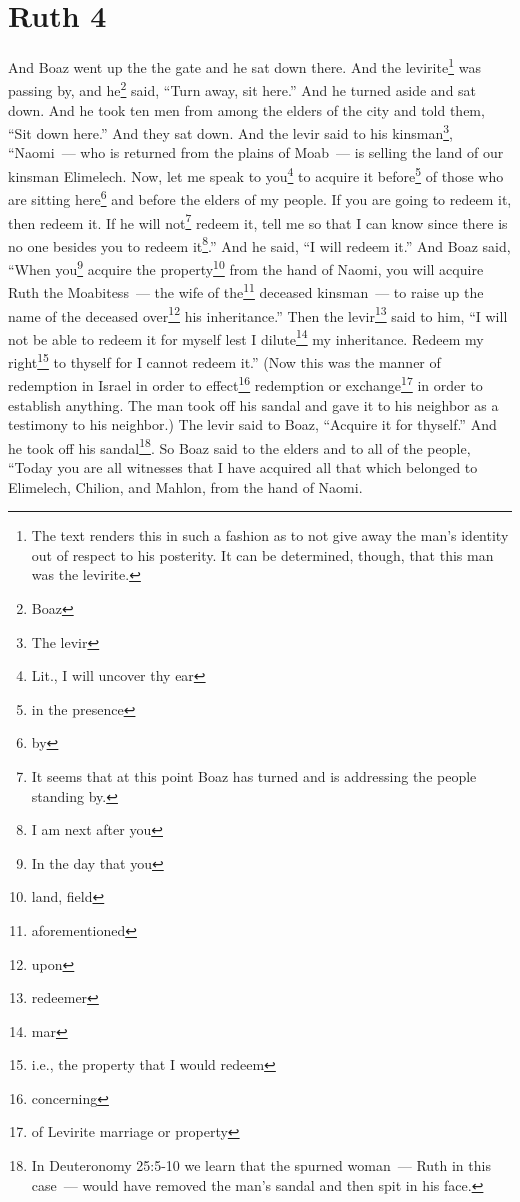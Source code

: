 \section{Ruth 4}\label{Ruth 4}
\begin{enumerate}[align=center]
     And Boaz went up the the gate and he sat down there. And the levirite\footnote{The text renders this in such a fashion as to not give away the man's identity out of respect to his posterity. It can be determined, though, that this man was the levirite.} was passing by, and he\footnote{Boaz} said, ``Turn away, sit here.'' And he turned aside and sat down.%
     And he took ten men from among the elders of the city and told them, ``Sit down here.'' And they sat down.%
     And the levir said to his kinsman\footnote{The levir}, ``Naomi~--- who is returned from the plains of Moab~--- is selling the land of our kinsman Elimelech.%
     Now, let me speak to you\footnote{Lit., I will uncover thy ear} to acquire it before\footnote{in the presence} of those who are sitting here\footnote{by} and before the elders of my people. If you are going to redeem it, then redeem it. If he will not\footnote{It seems that at this point Boaz has turned and is addressing the people standing by.} redeem it, tell me so that I can know since there is no one besides you to redeem it\footnote{I am next after you}.'' And he said, ``I will redeem it.''%
     And Boaz said, ``When you\footnote{In the day that you} acquire the property\footnote{land, field} from the hand of Naomi, you will acquire Ruth the Moabitess~--- the wife of the\footnote{aforementioned} deceased kinsman~--- to raise up the name of the deceased over\footnote{upon} his inheritance.''%
     Then the levir\footnote{redeemer} said to him, ``I will not be able to redeem it for myself lest I dilute\footnote{mar} my inheritance. Redeem my right\footnote{i.e., the property that I would redeem} to thyself for I cannot redeem it.''%
     (Now this was the manner of redemption in Israel in order to effect\footnote{concerning} redemption or exchange\footnote{of Levirite marriage or property} in order to establish anything. The man took off his sandal and gave it to his neighbor as a testimony to his neighbor.)%
     The levir said to Boaz, ``Acquire it for thyself.'' And he took off his sandal\footnote{In Deuteronomy 25:5-10 we learn that the spurned woman~--- Ruth in this case~--- would have removed the man's sandal and then spit in his face.}.%
     So Boaz said to the elders and to all of the people, ``Today you are all witnesses that I have acquired all that which belonged to Elimelech, Chilion, and Mahlon, from the hand of Naomi.%

\end{enumerate}
